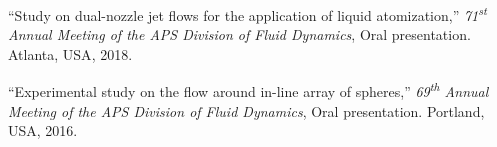 \begin{pubSubsectionNum}
  \item ``Study on dual-nozzle jet flows for the application of liquid atomization,''
        \textit{71\textsuperscript{st} Annual Meeting of the APS Division of Fluid Dynamics},
        Oral presentation.
        \textcolor{BrickRed}{Atlanta, USA}, 2018.

  \item ``Experimental study on the flow around in-line array of spheres,''
        \textit{69\textsuperscript{th} Annual Meeting of the APS Division of Fluid Dynamics},
        Oral presentation.
        \textcolor{BrickRed}{Portland, USA}, 2016.

\end{pubSubsectionNum}
